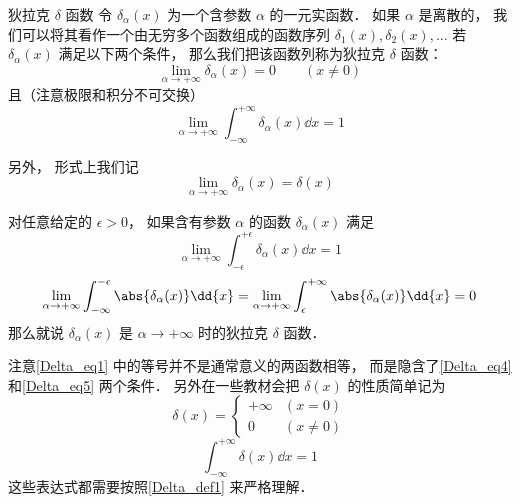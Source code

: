 \begin{definition}{狄拉克 $\delta$ 函数}\label{Delta_def1}
令 $\delta_\alpha(x)$ 为一个含参数 $\alpha$ 的一元实函数． 如果 $\alpha$ 是离散的， 我们可以将其看作一个由无穷多个函数组成的函数序列 $\delta_1(x), \delta_2(x), \dots$ 若 $\delta_\alpha(x)$ 满足以下两个条件， 那么我们把该函数列称为狄拉克 $\delta$ 函数：
\begin{equation}\label{Delta_eq4}
\lim_{\alpha\to+\infty} \delta_\alpha(x) = 0 \qquad (x \ne 0)
\end{equation}
且（注意极限和积分不可交换）
\begin{equation}\label{Delta_eq5}
\lim_{\alpha\to+\infty} \int_{-\infty}^{+\infty} \delta_\alpha(x) \dd{x} = 1
\end{equation}

另外， 形式上我们记
\begin{equation}\label{Delta_eq1}
\lim_{\alpha\to+\infty} \delta_\alpha(x) = \delta(x)
\end{equation}
\end{definition}
\begin{definition}{}
对任意给定的 $\epsilon > 0$， 如果含有参数 $\alpha$ 的函数 $\delta_\alpha(x)$ 满足
\begin{equation}
\lim_{\alpha\to+\infty} \int_{-\epsilon}^{+\epsilon} \delta_\alpha(x) \dd{x} = 1
\end{equation}
\begin{equation}
\lim_{\alpha\to+\infty} \int_{-\infty}^{-\epsilon} \abs{\delta_\alpha(x)} \dd{x}
= \lim_{\alpha\to+\infty} \int_{\epsilon}^{+\infty} \abs{\delta_\alpha(x)} \dd{x} = 0
\end{equation}
那么就说 $\delta_\alpha(x)$ 是 $\alpha\to+\infty$ 时的狄拉克 $\delta$ 函数．
\end{definition}
注意\autoref{Delta_eq1} 中的等号并不是通常意义的两函数相等， 而是隐含了\autoref{Delta_eq4} 和\autoref{Delta_eq5} 两个条件． 另外在一些教材会把 $\delta(x)$ 的性质简单记为
\begin{equation}\label{Delta_eq2}
\delta(x) =
\begin{cases}
+\infty & (x = 0)\\
0 & (x \ne 0)
\end{cases}
\end{equation}
\begin{equation}\label{Delta_eq3}
\int_{-\infty}^{+\infty} \delta(x) \dd{x} = 1
\end{equation}
这些表达式都需要按照\autoref{Delta_def1} 来严格理解．


